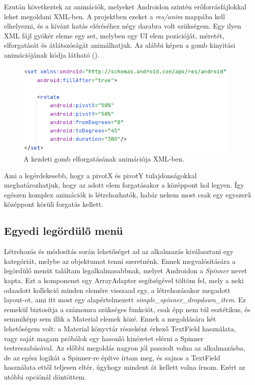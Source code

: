 Ezután következtek az animációk, melyeket Androidon szintén erőforrásfájlokkal lehet megoldani XML-ben. A projektben ezeket a \emph{res/anim} mappába kell elhelyezni, és a kívánt hatás eléréséhez négy darabra volt szükségem. Egy ilyen XML fájl gyökér eleme egy set, melyben egy UI elem pozícióját, méretét, elforgatását és átlátszóságát animálhatjuk. Az alábbi képen a gomb kinyitási animációjának kódja látható ().

\begin{figure}[!ht]
	\centering
	\includegraphics[width=110mm, keepaspectratio]{figures/animation_example.png}
	\caption{A kezdeti gomb elforgatásának animációja XML-ben.}
	\label{fig:ButtonAnimation}
\end{figure}

Ami a legérdekesebb, hogy a pivotX és pivotY tulajdonságokkal meghatározhatjuk, hogy az adott elem forgatásakor a középpont hol legyen. Így egészen komplex animációk is létrehozhatók, habár nekem most csak egy egyszerű középpont körüli forgatás kellett.

\subsection{Egyedi legördülő menü}
Létrehozás és módosítás során lehetőséget ad az alkalmazás kiválasztani egy kategóriát, melybe az objektumot tenni szeretnénk. Ennek megvalósítására a legördülő menüt találtam legalkalmasabbnak, melyet Androidon a \emph{Spinner} nevet kapta. Ezt a komponenst egy ArrayAdapter segítségével töltöm fel, mely a neki odaadott kollekció minden elemére visszaad egy, a létrehozásakor megadott layout-ot, ami itt most egy alapértelmezett \emph{simple\_spinner\_dropdown\_item}. Ez remekül biztosítja a számomra szükséges funkciót, csak épp nem túl esztétikus, és semmiképp sem illik a Material elemek közé. Ennek a megoldására két lehetőségem volt: a Material könyvtár részeként érkező TextField használata, vagy saját magam próbálok egy hasonló kinézetet elérni a Spinner testreszabásával. Az előbbi megoldás nagyon jól passzolt volna az alkalmazásba, de az egész logikát a Spinner-re építve írtam meg, és sajnos a TextField használata ettől teljesen eltér, úgyhogy mindent át kellett volna írnom. Ezért az utóbbi opciónál döntöttem.

